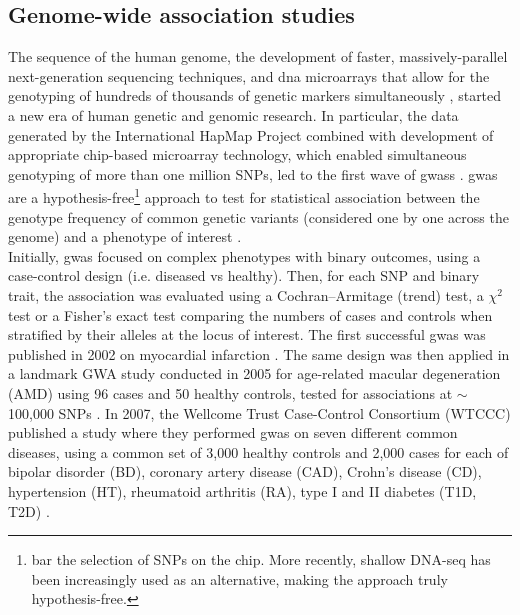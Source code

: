 \newpage

\subsection{Genome-wide association studies}
\label{sec:gwas}

The sequence of the human genome, the development of faster, massively-parallel next-generation sequencing techniques, 
and \gls{dna} microarrays that allow for the genotyping of hundreds of thousands of genetic markers simultaneously \cite{wang1998large}, started a new era of human genetic and genomic research.
In particular, the data generated by the International HapMap Project combined with development of appropriate chip-based microarray technology, which enabled simultaneous genotyping of more than one million SNPs, led to the first wave of \glspl{gwas} \cite{visscher2012five}.
\gls{gwas} are a hypothesis-free\footnote{bar the selection of SNPs on the chip. 
More recently, shallow DNA-seq has been increasingly used as an alternative, making the approach truly hypothesis-free.} approach to test for statistical association between the genotype frequency of common genetic variants (considered one by one across the genome) and a phenotype of interest \cite{mccarthy2008genome}. \\

Initially, \gls{gwas} focused on complex phenotypes with binary outcomes, using a case-control design (i.e. diseased vs healthy).
Then, for each SNP and binary trait, the association was evaluated using a Cochran–Armitage (trend) test, a $\chi^2$ test or a Fisher's exact test comparing the numbers of cases and controls when stratified by their alleles at the locus of interest. 
The first successful \gls{gwas} was published in 2002 on myocardial infarction \cite{ozaki2002functional}.
The same design was then applied in a landmark GWA study conducted in 2005 for age-related macular degeneration (AMD) using 96 cases and 50 healthy controls, tested for associations at $\sim$100,000 SNPs \cite{klein2005complement}. 
In 2007, the Wellcome Trust Case-Control Consortium (WTCCC) published a study where they performed \gls{gwas} on seven different common diseases, using a common set of 3,000 healthy controls and 2,000 cases for each of bipolar disorder (BD), coronary artery disease (CAD), Crohn's disease (CD), hypertension (HT), rheumatoid arthritis (RA), type I and II diabetes (T1D, T2D) \cite{wellcome2007genome}.\\

